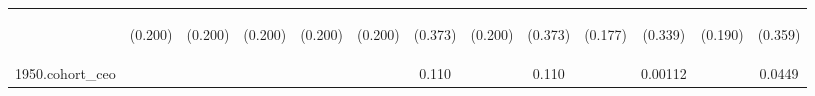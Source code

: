 \begin{center}
\begin{tabular}{lcccccccccccc}
\vspace{4pt} & \begin{footnotesize}(0.200)\end{footnotesize} & \begin{footnotesize}(0.200)\end{footnotesize} & \begin{footnotesize}(0.200)\end{footnotesize} & \begin{footnotesize}(0.200)\end{footnotesize} & \begin{footnotesize}(0.200)\end{footnotesize} & \begin{footnotesize}(0.373)\end{footnotesize} & \begin{footnotesize}(0.200)\end{footnotesize} & \begin{footnotesize}(0.373)\end{footnotesize} & \begin{footnotesize}(0.177)\end{footnotesize} & \begin{footnotesize}(0.339)\end{footnotesize} & \begin{footnotesize}(0.190)\end{footnotesize} & \begin{footnotesize}(0.359)\end{footnotesize} \\
1950.cohort\_ceo &  &  &  &  &  & 0.110 &  & 0.110 &  & 0.00112 &  & 0.0449 \\

\end{tabular}
\end{center}
